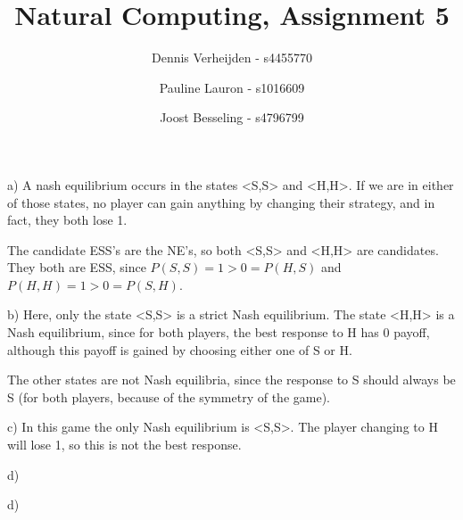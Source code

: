 \documentclass[11pt]{article}
\title{Natural Computing, Assignment 5}
\author{Dennis Verheijden - s4455770 \and Pauline Lauron - s1016609 \and Joost Besseling - s4796799}
\begin{document}
\maketitle

\section{}
a) A nash equilibrium occurs in the states <S,S> and <H,H>. If we are in either of those states, no player can gain anything by changing their strategy, and in fact, they both lose 1.

The candidate ESS's are the NE's, so both <S,S> and <H,H> are candidates. They both are ESS, since $P(S,S) = 1 > 0 = P(H,S)$ and $P(H,H) = 1 > 0 = P(S,H)$.

b) Here, only the state <S,S> is a strict Nash equilibrium. The state <H,H> is a Nash equilibrium, since for both players, the best response to H has 0 payoff, although this payoff is gained by choosing either one of S or H. 

The other states are not Nash equilibria, since the response to S should always be S (for both players, because of the symmetry of the game).

c) In this game the only Nash equilibrium is <S,S>. The player changing to H will lose 1, so this is not the best response.

d)



d)


\section{}
\end{document}
